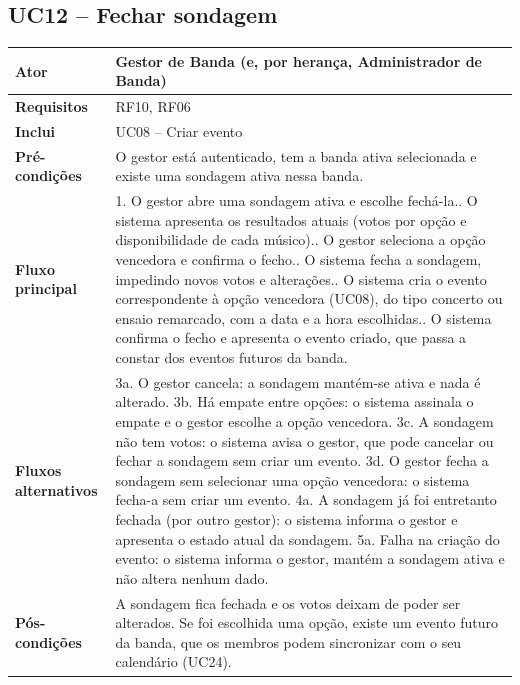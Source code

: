 \subsection{UC12 -- Fechar sondagem}
\begin{tabular}{|p{3.2cm}|p{11cm}|}
\hline
\textbf{Ator} & Gestor de Banda (e, por herança, Administrador de Banda) \\ \hline
\textbf{Requisitos} & RF10, RF06 \\ \hline
\textbf{Inclui} & UC08 -- Criar evento \\ \hline
\textbf{Pré-condições} & O gestor está autenticado, tem a banda ativa selecionada e existe uma sondagem ativa nessa banda. \\ \hline
\textbf{Fluxo principal} &
1. O gestor abre uma sondagem ativa e escolhe fechá-la.\newline
2. O sistema apresenta os resultados atuais (votos por opção e disponibilidade de cada músico).\newline
3. O gestor seleciona a opção vencedora e confirma o fecho.\newline
4. O sistema fecha a sondagem, impedindo novos votos e alterações.\newline
5. O sistema cria o evento correspondente à opção vencedora (UC08), do tipo concerto ou ensaio remarcado, com a data e a hora escolhidas.\newline
6. O sistema confirma o fecho e apresenta o evento criado, que passa a constar dos eventos futuros da banda. \\ \hline
\textbf{Fluxos alternativos} &
3a. O gestor cancela: a sondagem mantém-se ativa e nada é alterado.\newline
3b. Há empate entre opções: o sistema assinala o empate e o gestor escolhe a opção vencedora.\newline
3c. A sondagem não tem votos: o sistema avisa o gestor, que pode cancelar ou fechar a sondagem sem criar um evento.\newline
3d. O gestor fecha a sondagem sem selecionar uma opção vencedora: o sistema fecha-a sem criar um evento.\newline
4a. A sondagem já foi entretanto fechada (por outro gestor): o sistema informa o gestor e apresenta o estado atual da sondagem.\newline
5a. Falha na criação do evento: o sistema informa o gestor, mantém a sondagem ativa e não altera nenhum dado. \\ \hline
\textbf{Pós-condições} & A sondagem fica fechada e os votos deixam de poder ser alterados. Se foi escolhida uma opção, existe um evento futuro da banda, que os membros podem sincronizar com o seu calendário (UC24). \\ \hline
\end{tabular}

